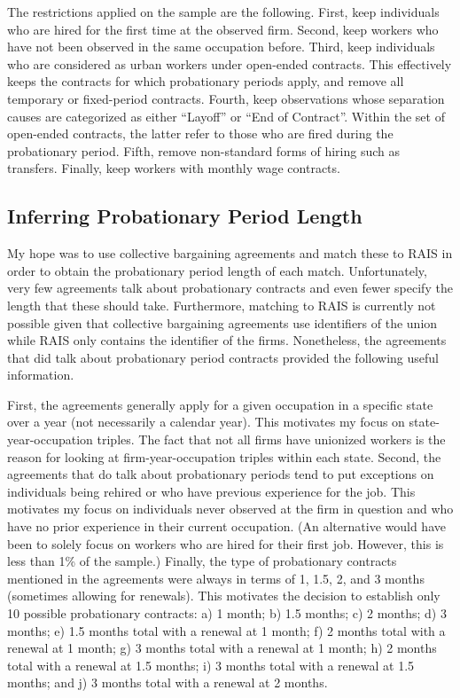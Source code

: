 \documentclass[12pt]{article}
\begin{document}
The restrictions applied on the sample are the following.
First, keep individuals who are hired for the first time at the observed firm.
Second, keep workers who have not been observed in the same occupation before.
Third, keep individuals who are considered as urban workers under open-ended contracts.
This effectively keeps the contracts for which probationary periods apply, and remove all temporary or fixed-period contracts.
Fourth, keep observations whose separation causes are categorized as either ``Layoff'' or ``End of Contract''.
Within the set of open-ended contracts, the latter refer to those who are fired during the probationary period.
Fifth, remove non-standard forms of hiring such as transfers.
Finally, keep workers with monthly wage contracts.

\subsection{Inferring Probationary Period Length} \label{infer_pp}

My hope was to use collective bargaining agreements and match these to RAIS in order to obtain the probationary period length of each match.
Unfortunately, very few agreements talk about probationary contracts and even fewer specify the length that these should take.
Furthermore, matching to RAIS is currently not possible given that collective bargaining agreements use identifiers of the union while RAIS only contains the identifier of the firms.
Nonetheless, the agreements that did talk about probationary period contracts provided the following useful information.

First, the agreements generally apply for a given occupation in a specific state over a year (not necessarily a calendar year).
This motivates my focus on state-year-occupation triples.
The fact that not all firms have unionized workers is the reason for looking at firm-year-occupation triples within each state.
Second, the agreements that do talk about probationary periods tend to put exceptions on individuals being rehired or who have previous experience for the job.
This motivates my focus on individuals never observed at the firm in question and who have no prior experience in their current occupation.
(An alternative would have been to solely focus on workers who are hired for their first job.
However, this is less than 1\% of the sample.)
Finally, the type of probationary contracts mentioned in the agreements were always in terms of 1, 1.5, 2, and 3 months (sometimes allowing for renewals).
This motivates the decision to establish only 10 possible probationary contracts: 
a) 1 month; 
b) 1.5 months; 
c) 2 months; 
d) 3 months; 
e) 1.5 months total with a renewal at 1 month; 
f) 2 months total with a renewal at 1 month; 
g) 3 months total with a renewal at 1 month; 
h) 2 months total with a renewal at 1.5 months; 
i) 3 months total with a renewal at 1.5 months; and 
j) 3 months total with a renewal at 2 months.
\end{document}
